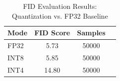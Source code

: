 \begin{table}[h]
\centering
\caption{FID Evaluation Results: Quantization vs. FP32 Baseline}
\label{tab:fid_eval}
\begin{tabular}{lccc}
\toprule
\textbf{Mode} & \textbf{FID Score}  & \textbf{Samples} \\
\midrule
FP32 & 5.73 & 50000 \\
INT8 & 5.85  & 50000 \\
INT4 & 14.80 & 50000 \\
\bottomrule
\end{tabular}
\end{table}
